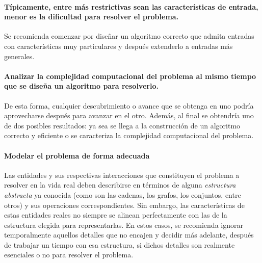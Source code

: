\paragraph*{Típicamente, entre más restrictivas sean las características de entrada, menor es la dificultad para resolver el problema.}{
  Se recomienda comenzar por diseñar un algoritmo correcto que admita entradas con características muy particulares y después extenderlo a entradas más generales. 
}

\paragraph*{Analizar la complejidad computacional del problema al mismo tiempo que se diseña un algoritmo para resolverlo.}{
  De esta forma, cualquier descubrimiento o avance que se obtenga en uno podría aprovecharse después para avanzar en el otro.
  Además, al final se obtendría uno de dos posibles resultados: ya sea se llega a la construcción de un algoritmo correcto y eficiente o se caracteriza la complejidad computacional del problema.
}

\paragraph*{Modelar el problema de forma adecuada}{
  Las entidades y sus respectivas interacciones que constituyen el problema a resolver en la vida real deben describirse en términos de alguna \emph{estructura abstracta} ya conocida (como son las cadenas, los grafos, los conjuntos, entre otros) y sus operaciones correspondientes.
  Sin embargo, las características de estas entidades reales no siempre se alinean perfectamente con las de la estructura elegida para representarlas.
  En estos casos, se recomienda ignorar temporalmente aquellos detalles que no encajen y decidir más adelante, después de trabajar un tiempo con esa estructura, si dichos detalles son realmente esenciales o no para resolver el problema.
}

